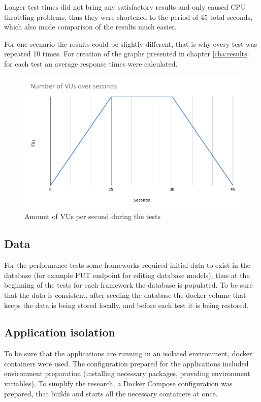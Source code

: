 Longer test times did not bring any satisfactory results and only caused CPU throttling problems, thus they were shortened to the period of 45 total seconds, which also made comparison of the results much easier.

For one scenario the results could be slightly different, that is why every test was repeated 10 times. For creation of the graphs presented in chapter \ref{cha:results} for each test an average response times were calculated. 

\begin{figure}[H]
    \includegraphics[width=\columnwidth]{pictures/vusPerSecond.png}
    \caption{Amount of VUs per second during the tests}
    \label{fig:vusPerSecond}
\end{figure}


\subsection{Data}

For the performance tests some frameworks required initial data to exist in the database (for example PUT endpoint for editing database models), thus at the beginning of the tests for each framework the database is populated. To be sure that the data is consistent, after seeding the database the docker volume that keeps the data is being stored locally, and before each test it is being restored.

\subsection{Application isolation}

To be sure that the applications are running in an isolated environment, docker containers were used. The configuration prepared for the applications included environment preparation (installing necessary packages, providing environment variables), To simplify the research, a Docker Compose configuration was prepared, that builds and starts all the necessary containers at once.


